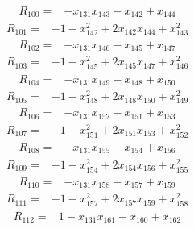 {\begin{align*}
R_{100} ={}& -x_{131} x_{143} - x_{142} + x_{144}
\end{align*}
\begin{align*}
R_{101} ={}& -1 - x_{142}^{2} + 2x_{142} x_{144} + x_{143}^{2}
\end{align*}
\begin{align*}
R_{102} ={}& -x_{131} x_{146} - x_{145} + x_{147}
\end{align*}
\begin{align*}
R_{103} ={}& -1 - x_{145}^{2} + 2x_{145} x_{147} + x_{146}^{2}
\end{align*}
\begin{align*}
R_{104} ={}& -x_{131} x_{149} - x_{148} + x_{150}
\end{align*}
\begin{align*}
R_{105} ={}& -1 - x_{148}^{2} + 2x_{148} x_{150} + x_{149}^{2}
\end{align*}
\begin{align*}
R_{106} ={}& -x_{131} x_{152} - x_{151} + x_{153}
\end{align*}
\begin{align*}
R_{107} ={}& -1 - x_{151}^{2} + 2x_{151} x_{153} + x_{152}^{2}
\end{align*}
\begin{align*}
R_{108} ={}& -x_{131} x_{155} - x_{154} + x_{156}
\end{align*}
\begin{align*}
R_{109} ={}& -1 - x_{154}^{2} + 2x_{154} x_{156} + x_{155}^{2}
\end{align*}
\begin{align*}
R_{110} ={}& -x_{131} x_{158} - x_{157} + x_{159}
\end{align*}
\begin{align*}
R_{111} ={}& -1 - x_{157}^{2} + 2x_{157} x_{159} + x_{158}^{2}
\end{align*}
\begin{align*}
R_{112} ={}& 1 - x_{131} x_{161} - x_{160} + x_{162}
\end{align*}
}
